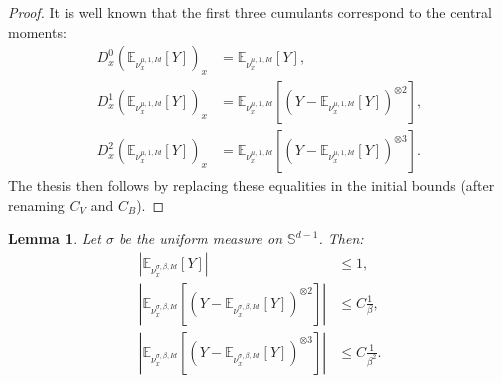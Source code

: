 \documentclass{article}
\numberwithin{theorem}{section}
\newtheorem{lemma}[theorem]{Lemma}
\begin{document}
\begin{proof}
It is well known that the first three cumulants correspond to the central moments:
\begin{equation}
\label{eq:derivatives_central_moments}
\begin{aligned}
D^0_x\left(\mathbb{E}_{\nu_{x}^{\mu,1,Id}}[Y] \right)_{x}&=\mathbb{E}_{\nu_{x}^{\mu,1,Id}}[Y],\\
D^1_x\left(\mathbb{E}_{\nu_{x}^{\mu,1,Id}}[Y] \right)_{x}&=\mathbb{E}_{\nu_{x}^{\mu,1,Id}}[\left(Y-\mathbb{E}_{\nu_{x}^{\mu,1,Id}}[Y]\right)^{\otimes 2}],\\
D^2_x \left(\mathbb{E}_{\nu_{x}^{\mu,1,Id}}[Y] \right)_{x}&=\mathbb{E}_{\nu_{x}^{\mu,1,Id}}[\left(Y-\mathbb{E}_{\nu_{x}^{\mu,1,Id}}[Y]\right)^{\otimes 3}].
\end{aligned}
\end{equation}
The thesis then follows by replacing these equalities in the initial bounds (after renaming $C_V$ and $C_B$).
\end{proof}

\begin{lemma}
\label{lem:sigma_cumulants}
    Let $\sigma$ be the uniform measure on $\mathbb{S}^{d-1}$. Then:
    \begin{align*}
        |\mathbb{E}_{\nu_{x}^{\sigma,\beta, Id}}[Y]|&\leq 1,\\
        |\mathbb{E}_{\nu_{x}^{\sigma,\beta,Id}}[\left(Y-\mathbb{E}_{\nu_{x}^{\sigma,\beta,Id}}[Y]\right)^{\otimes 2}]|&\leq C\frac{1}{\beta},\\
        |\mathbb{E}_{\nu_{x}^{\sigma,\beta,Id}}[\left(Y-\mathbb{E}_{\nu_{x}^{\sigma,\beta,Id}}[Y]\right)^{\otimes 3}]|&\leq C\frac{1}{\beta^2}.
    \end{align*}
\end{lemma}
\end{document}
